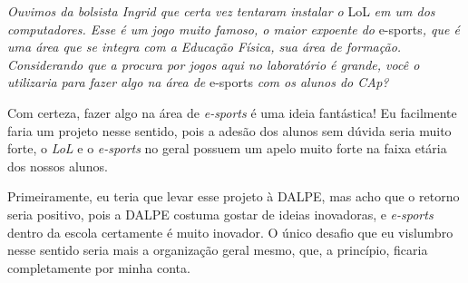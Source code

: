 \textit{Ouvimos da bolsista Ingrid que certa vez tentaram instalar o} LoL \textit{em um dos computadores. Esse é um jogo muito famoso, o maior expoente do} e-sports\textit{, que é uma área que se integra com a Educação Física, sua área de formação. Considerando que a procura por jogos aqui no laboratório é grande, você o utilizaria para fazer algo na área de} e-sports \textit{com os alunos do CAp?}

Com certeza, fazer algo na área de \textit{e-sports} é uma ideia fantástica! Eu facilmente faria um projeto nesse sentido, pois a adesão dos alunos sem dúvida seria muito forte, o \textit{LoL} e o \textit{e-sports} no geral possuem um apelo muito forte na faixa etária dos nossos alunos.

Primeiramente, eu teria que levar esse projeto à DALPE, mas acho que o retorno seria positivo, pois a DALPE costuma gostar de ideias inovadoras, e \textit{e-sports} dentro da escola certamente é muito inovador. O único desafio que eu vislumbro nesse sentido seria mais a organização geral mesmo, que, a princípio, ficaria completamente por minha conta.
